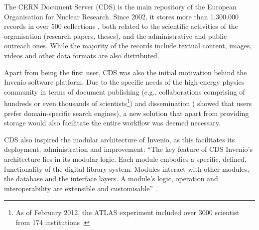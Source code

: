 
The CERN Document Server (CDS) is the main repository of the European
Organisation for Nuclear Research. Since 2002, it stores more than 1.300.000
records \cite{ref:cds} in over 500 collections \cite{ref:ludmilathesis}, both
related to the scientific activities of the organisation (research papers,
theses), and the administrative and public outreach ones. While the
majority of the records include textual content, images, videos and other data
formats are also distributed.

Apart from being the first user, CDS was also the initial motivation behind the
Invenio software platform. Due to the specific needs of the high-energy physics
community in terms of document publishing (e.g., collaborations comprising of
hundreds or even thousands of scientists\footnote{As of February 2012, the
ATLAS experiment included over 3000 scientist from 174 institutions
\cite{ref:atlas}.}) and dissemination (\cite{ref:annette} showed that users
prefer domain-specific search engines), a new solution that apart from
providing storage would also facilitate the entire workflow was deemed
necessary.

CDS also inspired the modular architecture of Invenio, as this facilitates its
deployment, administration and improvement: ``The key feature of CDS Invenio's
architecture lies in its modular logic. Each module embodies a specific,
defined, functionality of the digital library system. Modules interact with
other modules, the database and the interface layers. A module's logic,
operation and interoperability are extensible and customisable''
\cite{ref:lemeur}.
